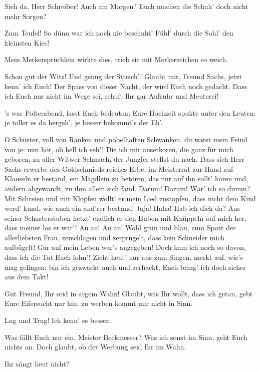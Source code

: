 \begin{drama}
Sieh da, Herr Schreiber! Auch am Morgen?
Euch machen die Schuh' doch nicht mehr Sorgen?

\Beckmesserspeaks
Zum Teufel! So dünn war ich noch nie beschuht!
Fühl' durch die Sohl' den kleinsten Kies!

\Sachsspeaks
Mein Merkersprüchlein wirkte dies,
trieb sie mit Merkerzeichen so weich.

\Beckmesserspeaks
Schon gut der Witz! Und genug der Streich'!
Glaubt mir, Freund Sachs, jetzt kenn' ich Euch!
Der Spass von dieser Nacht, der wird Euch noch gedacht.
Dass ich Euch nur nicht im Wege sei,
schuft Ihr gar Aufruhr und Meuterei!

\Sachsspeaks
's war Polterabend, lasst Euch bedeuten;
Eure Hochzeit spukte unter den Leuten:
je toller es da hergeh',
je besser bekommt's der Eh'.

\Beckmesserspeaks


O Schuster, voll von Ränken
und pöbelhaften Schwänken,
du warst mein Feind von je:
nun hör, ob hell ich seh'!
Die ich mir auserkoren,
die ganz für mich geboren,
zu aller Witwer Schmach,
der Jungfer stellst du nach.
Dass sich Herr Sachs erwerbe
des Goldschmieds reiches Erbe,
im Meisterrat zur Hand
auf Klauseln er bestand,
ein Mägdlein zu betören,
das nur auf ihn sollt' hören
und, andern abgewandt,
zu ihm allein sich fand.
Darum! Darum!
Wär' ich so dumm?
Mit Schreien und mit Klopfen
wollt' er mein Lied zustopfen,
dass nicht dem Kind werd' kund,
wie auch ein and'rer bestund!
Jaja! Haha! Hab ich dich da?
Aus seiner Schusterstuben
hetzt' endlich er den Buben
mit Knüppeln auf mich her,
dass meiner los er wär'!
Au au! Au au! Wohl grün und blau,
zum Spott der allerliebsten Frau,
zerschlagen und zerprügelt,
dass kein Schneider mich aufbügelt!
Gar auf mein Leben war's angegeben!
Doch kam ich noch so davon,
dass ich die Tat Euch lohn'!
Zieht heut' nur aus zum Singen,
merkt auf, wie's mag gelingen;
bin ich gezwackt auch und zerhackt,
Euch bring' ich doch sicher aus dem Takt!

\Sachsspeaks
Gut Freund, Ihr seid in argem Wahn!
Glaubt, was Ihr wollt, dass ich getan,
gebt Eure Eifersucht nur hin;
zu werben kommt mir nicht in Sinn.

\Beckmesserspeaks
Lug und Trug! Ich kenn' es besser.

\Sachsspeaks
Was fällt Euch nur ein, Meister Beckmesser?
Was ich sonst im Sinn, geht Euch nichts an.
Doch glaubt, ob der Werbung seid Ihr im Wahn.

\Beckmesserspeaks
Ihr sängt heut nicht?


\end{drama}
